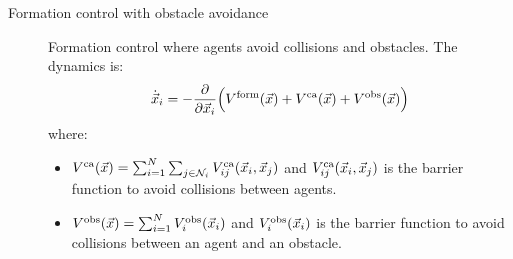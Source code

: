 \begin{description}
    \item[Formation control with obstacle avoidance] 
        Formation control where agents avoid collisions and obstacles. The dynamics is:
        \[
            \dot{{\vec{x}}}_i = - \frac{\partial}{\partial {\vec{x}}_i} \Big( V^\text{form}({\vec{x}}) + V^\text{ca}({\vec{x}}) + V^\text{obs}({\vec{x}}) \Big)
        \]
        where:
        \begin{itemize}
            \item $V^\text{ca}({\vec{x}}) = \sum_{i=1}^N \sum_{j \in \mathcal{N}_i} V_{ij}^\text{ca}({\vec{x}}_i, {\vec{x}}_j)$ and $V_{ij}^\text{ca}({\vec{x}}_i, {\vec{x}}_j)$ is the barrier function to avoid collisions between agents.
            \item $V^\text{obs}({\vec{x}}) = \sum_{i=1}^N V_{i}^\text{obs}({\vec{x}}_i)$ and $V_{i}^\text{obs}({\vec{x}}_i)$ is the barrier function to avoid collisions between an agent and an obstacle.
        \end{itemize}
\end{description}


